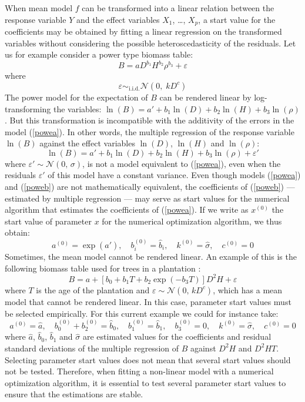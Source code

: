 When mean model $f$ can be transformed into a linear relation between the response variable $Y$ and the effect variables $X_1$, \ldots, $X_p$, a start value for the coefficients may be obtained by fitting a linear regression on the transformed variables without considering the possible heteroscedasticity of the residuals. Let us for example consider a power type biomass table:
\begin{equation}
B=aD^{b_1}H^{b_2}\rho^{b_3}+\varepsilon\label{powea}
\end{equation}
where
\[
\varepsilon\mathop{\sim}_{\mathrm{i.i.d.}}\mathcal{N}(0,\;kD^c)
\]
The power model for the expectation of $B$ can be rendered linear by log-transforming the variables: $\ln(B)=a'+b_1\ln(D)+b_2\ln(H)+b_3\ln(\rho)$. But this transformation is incompatible with the additivity of the errors in the model (\ref{powea}). In other words, the multiple regression of the response variable $\ln(B)$ against the effect variables $\ln(D)$, $\ln(H)$ and $\ln(\rho)$:
\begin{equation}
\ln(B)=a'+b_1\ln(D)+b_2\ln(H)+b_3\ln(\rho)+\varepsilon'\label{poweb}
\end{equation}
where $\varepsilon'\sim\mathcal{N}(0,\,\sigma)$, is not a model equivalent to (\ref{powea}), even when the residuals $\varepsilon'$ of this model have a constant variance. Even though models (\ref{powea}) and (\ref{poweb}) are not mathematically equivalent, the coefficients of (\ref{poweb}) --- estimated by multiple regression --- may serve as start values for the numerical algorithm that estimates the coefficients of (\ref{powea}). If we write as $x^{(0)}$ the start value of parameter $x$ for the numerical optimization algorithm, we thus obtain:
\[
a^{(0)}=\exp(\hat{a}'),\quad b_i^{(0)}=\hat{b}_i,\quad
k^{(0)}=\hat{\sigma},\quad c^{(0)}=0
\]
Sometimes, the mean model cannot be rendered linear. An example of this is the following biomass table used for trees in a plantation \citep{saintandre05}:
\[
B=a+[b_0+b_1T+b_2\exp(-b_3T)]D^2H+\varepsilon
\]
where $T$ is the age of the plantation and $\varepsilon\sim\mathcal{N}(0,\,kD^c)$, which has a mean model that cannot be rendered linear. In this case, parameter start values must be selected empirically. For this current example we could for instance take:
\[
a^{(0)}=\hat{a},\quad b_0^{(0)}+b_2^{(0)}=\hat{b}_0,\quad
b_1^{(0)}=\hat{b}_1,\quad b_3^{(0)}=0,\quad
k^{(0)}=\hat{\sigma},\quad c^{(0)}=0
\]
where $\hat{a}$, $\hat{b}_0$, $\hat{b}_1$ and $\hat{\sigma}$ are estimated values for the coefficients and residual standard deviations of the multiple regression of $B$ against $D^2H$ and $D^2HT$.
Selecting parameter start values does not mean that several start values should not be tested. Therefore, when fitting a non-linear model with a numerical optimization algorithm, it is essential to test several parameter start values to ensure that the estimations are stable.

